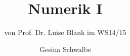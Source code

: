 \documentclass[ngerman,fontsize=11pt, paper=a4, parskip=half, titlepage=true, toc=bib]{scrbook}
\begin{document}
\frontmatter	%
\subject{Vorlesungsmitschrift zur Vorlesung}
\title{Numerik I}
\subtitle{von Prof. Dr. Luise Blank im WS14/15}
\author{Gesina Schwalbe}
\maketitle
\tableofcontents


\mainmatter		%





















\nocite{*} %
\backmatter		%


\printindex		%

\printbibliography	%
\end{document}
